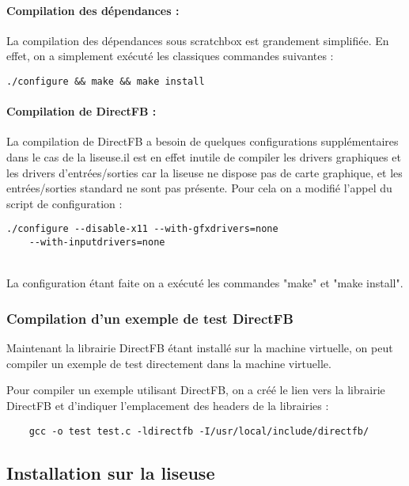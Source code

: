 \paragraph{Compilation des dépendances :}

La compilation des dépendances sous scratchbox est grandement simplifiée. En effet, on a simplement exécuté les classiques commandes suivantes : 
	\begin{lstlisting}
./configure && make && make install
	\end{lstlisting}

\paragraph{Compilation de DirectFB :}

La compilation de DirectFB a besoin de quelques configurations supplémentaires dans le cas de la liseuse.il est en effet inutile de compiler les drivers graphiques et les drivers d'entrées/sorties car la liseuse ne dispose pas de carte graphique, et les entrées/sorties standard ne sont pas présente.
Pour cela on a modifié l'appel du script de configuration : 
\begin{lstlisting}
./configure --disable-x11 --with-gfxdrivers=none 
	--with-inputdrivers=none
\end{lstlisting}
~\\
La configuration étant faite on a exécuté les commandes "make" et "make install".

\subsubsection{Compilation d'un exemple de test DirectFB}

Maintenant la librairie DirectFB étant installé sur la machine virtuelle, on peut compiler un exemple de test directement dans la machine virtuelle.

Pour compiler un exemple utilisant DirectFB, on a créé le lien vers la librairie DirectFB et d'indiquer l'emplacement des headers de la librairies : 
\begin{lstlisting}
	gcc -o test test.c -ldirectfb -I/usr/local/include/directfb/
\end{lstlisting}

\subsection{Installation sur la liseuse}

